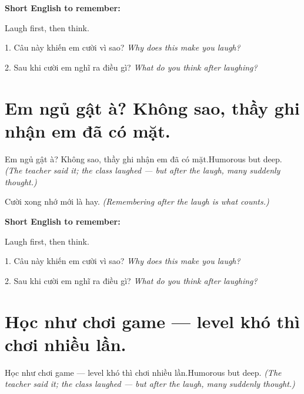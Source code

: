\begin{ghinhoanh}
\textbf{Short English to remember:}

Laugh first, then think.

\end{ghinhoanh}

\begin{tuhocnhanh}
1. Câu này khiến em cười vì sao? \textit{Why does this make you laugh?}

2. Sau khi cười em nghĩ ra điều gì? \textit{What do you think after laughing?}
\end{tuhocnhanh}
\ngancach


\section{Em ngủ gật à? Không sao, thầy ghi nhận em đã có mặt.}
\begin{truyen}{Em ngủ gật à? Không sao, thầy ghi nhận em đã có mặt.}{Humorous but deep.}
\textit{(The teacher said it; the class laughed — but after the laugh, many suddenly thought.)}
\end{truyen}

\begin{baihoc}
Cười xong nhớ mới là hay.
\textit{(Remembering after the laugh is what counts.)}
\end{baihoc}

\begin{ghinhoanh}
\textbf{Short English to remember:}

Laugh first, then think.

\end{ghinhoanh}

\begin{tuhocnhanh}
1. Câu này khiến em cười vì sao? \textit{Why does this make you laugh?}

2. Sau khi cười em nghĩ ra điều gì? \textit{What do you think after laughing?}
\end{tuhocnhanh}
\ngancach


\section{Học như chơi game — level khó thì chơi nhiều lần.}
\begin{truyen}{Học như chơi game — level khó thì chơi nhiều lần.}{Humorous but deep.}
\textit{(The teacher said it; the class laughed — but after the laugh, many suddenly thought.)}
\end{truyen}

